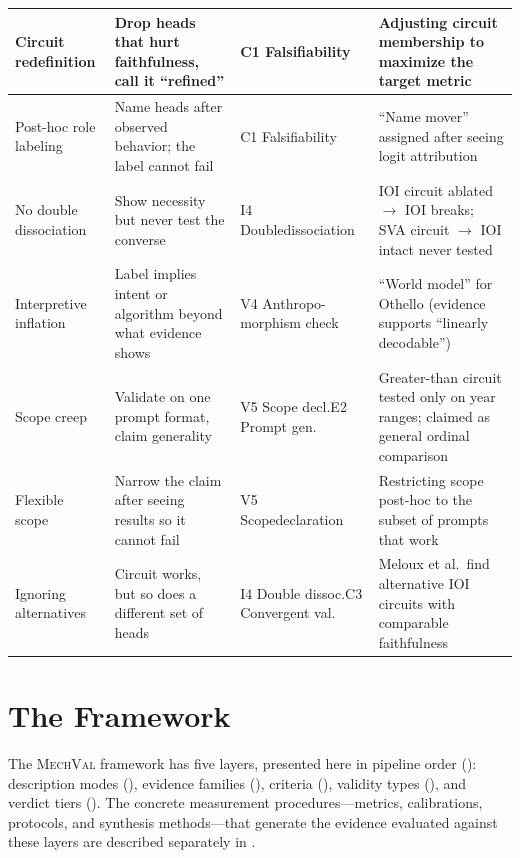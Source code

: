\documentclass{article}
\newcommand{\mechval}{\textsc{MechVal}}
\begin{document}
\begin{table}[H]
\begin{tabular}{@{}l>{\raggedright\arraybackslash}p{3.2cm}>{\raggedright\arraybackslash}p{2.8cm}>{\raggedright\arraybackslash}p{4.0cm}@{}}
\midrule
Circuit redefinition & Drop heads that hurt faithfulness, call it ``refined'' & C1 Falsifiability & Adjusting circuit membership to maximize the target metric \\
\midrule
Post-hoc role labeling & Name heads after observed behavior; the label cannot fail & C1 Falsifiability & ``Name mover'' assigned after seeing logit attribution \\
\midrule
No double dissociation & Show necessity but never test the converse & I4 Double\newline dissociation & IOI circuit ablated $\to$ IOI breaks; SVA circuit $\to$ IOI intact never tested \\
\midrule
Interpretive inflation & Label implies intent or algorithm beyond what evidence shows & V4 Anthropo-\newline morphism check & ``World model'' for Othello (evidence supports ``linearly decodable'') \\
\midrule
Scope creep & Validate on one prompt format, claim generality & V5 Scope decl.\newline E2 Prompt gen. & Greater-than circuit tested only on year ranges; claimed as general ordinal comparison \\
\midrule
Flexible scope & Narrow the claim after seeing results so it cannot fail & V5 Scope\newline declaration & Restricting scope post-hoc to the subset of prompts that work \\
\midrule
Ignoring alternatives & Circuit works, but so does a different set of heads & I4 Double dissoc.\newline C3 Convergent val. & Meloux et al.\ find alternative IOI circuits with comparable faithfulness \\
\bottomrule
\end{tabular}
\end{table}
\endgroup


\section{The Framework}
\label{sec:framework}


The \mechval{} framework has five layers, presented here in pipeline order (): description modes (), evidence families (), criteria (), validity types (), and verdict tiers (). The concrete measurement procedures---metrics, calibrations, protocols, and synthesis methods---that generate the evidence evaluated against these layers are described separately in .
\end{document}
